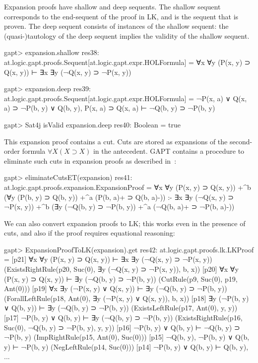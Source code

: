 \documentclass[a4paper,11pt]{article}
\newcommand{\impl}{\supset} %
\begin{document}
Expansion proofs have shallow and deep sequents.  The shallow sequent
corresponds to the end-sequent of the proof in LK, and is the sequent that is
proven.  The deep sequent consists of instances of the shallow sequent: the
(quasi-)tautology of the deep sequent implies the validity of the shallow
sequent.
\begin{clilisting}
gapt> expansion.shallow
res38: at.logic.gapt.proofs.Sequent[at.logic.gapt.expr.HOLFormula] = ∀x ∀y (P(x, y) ⊃ Q(x, y)) ⊢ ∃x ∃y (¬Q(x, y) ⊃ ¬P(x, y))

gapt> expansion.deep
res39: at.logic.gapt.proofs.Sequent[at.logic.gapt.expr.HOLFormula] =
¬P(x, a) ∨ Q(x, a) ⊃ ¬P(b, y) ∨ Q(b, y),
P(x, a) ⊃ Q(x, a)
⊢
¬Q(b, y) ⊃ ¬P(b, y)

gapt> Sat4j isValid expansion.deep
res40: Boolean = true

\end{clilisting}

This expansion proof contains a cut.  Cuts are stored as expansions of the
second-order formula $\forall X (X \impl X)$ in the antecedent.  GAPT contains
a procedure to eliminate such cuts in expansion proofs as described
in~\cite{Hetzl2013Expansion}:
\begin{clilisting}
gapt> eliminateCutsET(expansion)
res41: at.logic.gapt.proofs.expansion.ExpansionProof =
∀x ∀y (P(x, y) ⊃ Q(x, y))
  +^{b} (∀y (P(b, y) ⊃ Q(b, y)) +^{a} (P(b, a)+ ⊃ Q(b, a)-))
:-
∃x ∃y (¬Q(x, y) ⊃ ¬P(x, y))
  +^{b} (∃y (¬Q(b, y) ⊃ ¬P(b, y)) +^{a} (¬Q(b, a)+ ⊃ ¬P(b, a)-))

\end{clilisting}

We can also convert expansion proofs to LK; this works even in the presence of
cuts, and also if the proof requires equational reasoning:
\begin{clilisting}
gapt> ExpansionProofToLK(expansion).get
res42: at.logic.gapt.proofs.lk.LKProof =
[p21] ∀x ∀y (P(x, y) ⊃ Q(x, y)) ⊢ ∃x ∃y (¬Q(x, y) ⊃ ¬P(x, y))    (ExistsRightRule(p20, Suc(0), ∃y (¬Q(x, y) ⊃ ¬P(x, y)), b, x))
[p20] ∀x ∀y (P(x, y) ⊃ Q(x, y)) ⊢ ∃y (¬Q(b, y) ⊃ ¬P(b, y))    (CutRule(p9, Suc(0), p19, Ant(0)))
[p19] ∀x ∃y (¬P(x, y) ∨ Q(x, y)) ⊢ ∃y (¬Q(b, y) ⊃ ¬P(b, y))    (ForallLeftRule(p18, Ant(0), ∃y (¬P(x, y) ∨ Q(x, y)), b, x))
[p18] ∃y (¬P(b, y) ∨ Q(b, y)) ⊢ ∃y (¬Q(b, y) ⊃ ¬P(b, y))    (ExistsLeftRule(p17, Ant(0), y, y))
[p17] ¬P(b, y) ∨ Q(b, y) ⊢ ∃y (¬Q(b, y) ⊃ ¬P(b, y))    (ExistsRightRule(p16, Suc(0), ¬Q(b, y) ⊃ ¬P(b, y), y, y))
[p16] ¬P(b, y) ∨ Q(b, y) ⊢ ¬Q(b, y) ⊃ ¬P(b, y)    (ImpRightRule(p15, Ant(0), Suc(0)))
[p15] ¬Q(b, y), ¬P(b, y) ∨ Q(b, y) ⊢ ¬P(b, y)    (NegLeftRule(p14, Suc(0)))
[p14] ¬P(b, y) ∨ Q(b, y) ⊢ Q(b, y), ...
\end{clilisting}
\end{document}
